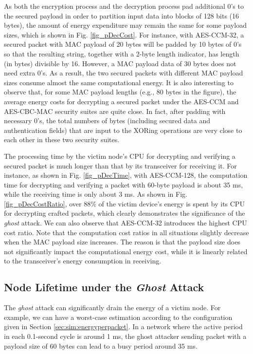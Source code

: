 \documentclass[10pt,journal,cspaper,compsoc]{IEEEtran}
\begin{document}
As both the encryption process and the decryption process pad additional 0's to the secured payload in order to partition input data into blocks of 128 bits (16 bytes), the amount of energy expenditure may remain the same for some payload sizes, which is shown in Fig. \ref{fig_pDecCost}. For instance, with AES-CCM-32, a secured packet with MAC payload of 20 bytes will be padded by 10 bytes of 0's so that the resulting string, together with a 2-byte length indicator, has length (in bytes) divisible by 16. However, a MAC payload data of 30 bytes does not need extra 0's. As a result, the two secured packets with different MAC payload sizes consume almost the same computational energy. It is also interesting to observe that, for some MAC payload lengths (e.g., 80 bytes in the figure), the average energy costs for decrypting a secured packet under the AES-CCM and AES-CBC-MAC security suites are quite close. In fact, after padding with necessary 0's, the total numbers of bytes (including secured data and authentication fields) that are input to the XORing operations are very close to each other in these two security suites.


The processing time by the victim node's CPU for decrypting and verifying a secured packet is much longer than that by its transceiver for receiving it. For instance, as shown in Fig. \ref{fig_pDecTime}, with AES-CCM-128, the computation time for decrypting and verifying a packet with 60-byte payload is about 35 ms, while the receiving time is only about 3 ms. As shown in Fig. \ref{fig_pDecCostRatio}, over 88\% of the victim device's energy is spent by its CPU for decrypting crafted packets, which clearly demonstrates the significance of the {\em ghost} attack. We can also observe that AES-CCM-32 introduces the highest CPU cost ratio. Note that the computation cost ratios in all situations slightly decrease when the MAC payload size increases. The reason is that the payload size does not significantly impact the computational energy cost, while it is linearly related to the transceiver's energy consumption in receiving.


\subsection{Node Lifetime under the {\bf \em Ghost} Attack}\label{sec:sim:lifetime}
The {\em ghost} attack can significantly drain the energy of a victim node. For example, we can have a worst-case estimation according to the configuration given in Section \ref{sec:sim:energyperpacket}. In a network where the active period in each 0.1-second cycle is around 1 ms, the ghost attacker sending packet with a payload size of 60 bytes can lead to a busy period around 35 ms.
\end{document}
